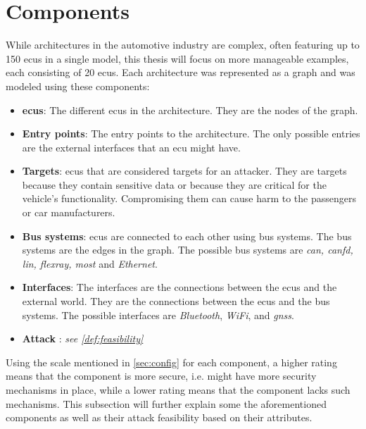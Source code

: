 \section{Components}
\label{sec:components}

While architectures in the automotive industry are complex, often featuring up to 150 \acrshort{ecu}s in a single model, 
this thesis will focus on more manageable examples, each consisting of 20 \acrshort{ecu}s.
Each architecture was represented as a graph and was modeled using these components:

\begin{itemize}

    \item \textbf{\acrlong{ecu}s}: The different \acrshort{ecu}s in the architecture. 
        They are the nodes of the graph.
    
    \item \textbf{Entry points}: The entry points to the architecture. 
        The only possible entries are the external interfaces that an \acrshort{ecu} might have.
    
    \item \textbf{Targets}: \acrshort{ecu}s that are considered targets for an attacker. 
        They are targets because they contain sensitive data or because they are critical for the vehicle's functionality.
        Compromising them can cause harm to the passengers or car manufacturers.
    
    \item \textbf{Bus systems}: \acrshort{ecu}s are connected to each other using bus systems. The bus systems are the edges in the graph. 
        The possible bus systems are \textit{\acrshort{can}, \acrshort{canfd}, \acrshort{lin}, \acrshort{flexray}, \acrshort{most}} and \textit{Ethernet}.
    
    \item \textbf{Interfaces}: The interfaces are the connections between the \acrshort{ecu}s and the external world. They are the connections between the \acrshort{ecu}s and the bus systems. 
        The possible interfaces are \textit{Bluetooth}, \textit{WiFi}, and \textit{\acrshort{gnss}}.
    
    \item \textbf{Attack }: \textit{see {\ref{def:feasibility}}}
    
\end{itemize}

Using the scale mentioned in \ref{sec:config} for each component, a higher rating means that the component is more secure, i.e. might have more security mechanisms in place,
while a lower rating means that the component lacks such mechanisms.
This subsection will further explain some the aforementioned components as well as their attack feasibility based on their attributes.

